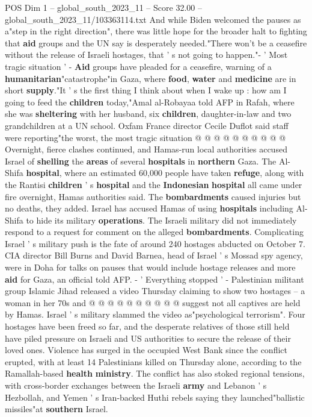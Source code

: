 \begin{textsample}{POS Dim 1 – global\_south\_2023\_11 – Score 32.00 – global\_south\_2023\_11/103363114.txt}
And while Biden welcomed the pauses as a"step in the right direction", there was little hope for the broader halt to fighting that \textbf{aid} groups and the UN say is desperately needed."There won't be a ceasefire without the release of Israeli hostages, that ' s not going to happen."- ' Most tragic situation ' - \textbf{Aid} groups have pleaded for a ceasefire, warning of a \textbf{humanitarian}"catastrophe"in Gaza, where \textbf{food}, \textbf{water} and \textbf{medicine} are in short \textbf{supply}."It ' s the first thing I think about when I wake up : how am I going to feed the \textbf{children} today,"Amal al-Robayaa told AFP in Rafah, where she was \textbf{sheltering} with her husband, six \textbf{children}, daughter-in-law and two grandchildren at a UN school.
Oxfam France director Cecile Duflot said staff were reporting"the worst, the most tragic situation @ @ @ @ @ @ @ @ @ @ Overnight, fierce clashes continued, and Hamas-run local authorities accused Israel of \textbf{shelling} the \textbf{areas} of several \textbf{hospitals} in \textbf{northern} Gaza.
The Al-Shifa \textbf{hospital}, where an estimated 60,000 people have taken \textbf{refuge}, along with the Rantisi \textbf{children} ' s \textbf{hospital} and the \textbf{Indonesian} \textbf{hospital} all came under fire overnight, Hamas authorities said.
The \textbf{bombardments} caused injuries but no deaths, they added.
Israel has accused Hamas of using \textbf{hospitals} including Al-Shifa to hide its military \textbf{operations}.
The Israeli military did not immediately respond to a request for comment on the alleged \textbf{bombardments}.
Complicating Israel ' s military push is the fate of around 240 hostages abducted on October 7.
CIA director Bill Burns and David Barnea, head of Israel ' s Mossad spy agency, were in Doha for talks on pauses that would include hostage releases and more \textbf{aid} for Gaza, an official told AFP. - ' Everything stopped ' - Palestinian militant group Islamic Jihad released a video Thursday claiming to show two hostages -- a woman in her 70s and @ @ @ @ @ @ @ @ @ @ suggest not all captives are held by Hamas.
Israel ' s military slammed the video as"psychological terrorism".
Four hostages have been freed so far, and the desperate relatives of those still held have piled pressure on Israeli and US authorities to secure the release of their loved ones.
Violence has surged in the occupied West Bank since the conflict erupted, with at least 14 Palestinians killed on Thursday alone, according to the Ramallah-based \textbf{health} \textbf{ministry}.
The conflict has also stoked regional tensions, with cross-border exchanges between the Israeli \textbf{army} and Lebanon ' s Hezbollah, and Yemen ' s Iran-backed Huthi rebels saying they launched"ballistic missiles"at \textbf{southern} Israel.

\end{textsample}
